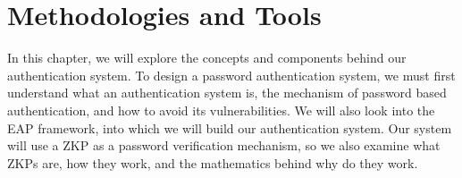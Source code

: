 \chapter{Methodologies and Tools}
\thispagestyle{fancy}
\label{chapter:2}

\noindent
In this chapter, we will explore the concepts and components behind our authentication system.
To design a password authentication system, we must first understand what an authentication system is, the mechanism of password based authentication, and how to avoid its vulnerabilities.
We will also look into the EAP framework, into which we will build our authentication system.
Our system will use a ZKP as a password verification mechanism, so we also examine what ZKPs are, how they work, and the mathematics behind why do they work.